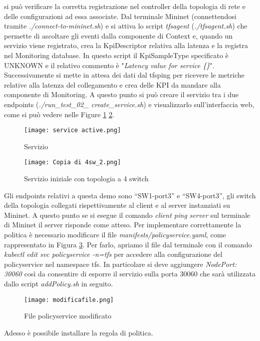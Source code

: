 si può verificare la corretta registrazione nel controller della topologia di rete e delle configurazioni ad essa associate.
Dal terminale Mininet (connettendosi tramite \textit{./connect-to-mininet.sh}) e
si attiva lo script \textit{tfsagent} (\textit{./tfsagent.sh}) che permette di ascoltare gli eventi dalla componente di Context e, 
quando un servizio viene registrato, crea la KpiDescriptor relativa alla latenza e la registra nel Monitoring database.
In questo script il KpiSampleType specificato è UNKNOWN e il relativo commento è "\textit{Latency value for service \{\}}".
Successivamente si mette in attesa dei dati dal tfsping per ricevere le metriche relative alla latenza del collegamento e crea delle KPI da mandare alla componente di Monitoring.
\newline A questo punto si può creare il servizio tra i due endpoints (\textit{./run\_test\_02\_ create\_service.sh}) e visualizzarlo sull'interfaccia web, come si può vedere nelle Figure \ref{fig:ser} \ref{fig:sw4}.
\begin{figure}[h]
    \centering
    \texttt{[image: service active.png]}
    \caption{Servizio}
    \label{fig:ser}
\end{figure}
\begin{figure}[h]
    \centering
    \texttt{[image: Copia di 4sw\_2.png]}
    \caption{Servizio iniziale con topologia a 4 switch}
    \label{fig:sw4}
\end{figure}
Gli endpoints relativi a questa demo sono “SW1-port3” e “SW4-port3”, 
gli switch della topologia collegati rispettivamente al client e al server instanziati su Mininet.
A questo punto se si esegue il comando \textit{client ping server} sul terminale di Mininet il server risponde come atteso.
Per implementare correttamente la politica è necessario modificare il file \textit{manifests/policyservice.yaml}, come rappresentato in Figura \ref{fig:pol}.
Per farlo, apriamo il file dal terminale con il comando \textit{kubectl edit svc policyservice -n=tfs} per accedere alla configurazione del policyservice nel namespace tfs.
In particolare si deve aggiungere \textit{NodePort: 30060} così da consentire di esporre il servizio sulla porta 30060 che sarà utilizzata dallo script \textit{addPolicy.sh} in seguito.
\begin{figure}[h]
    \centering
    \texttt{[image: modificafile.png]}
    \caption{File policyservice modificato}
    \label{fig:pol}
\end{figure}
Adesso è possibile installare la regola di politica.
